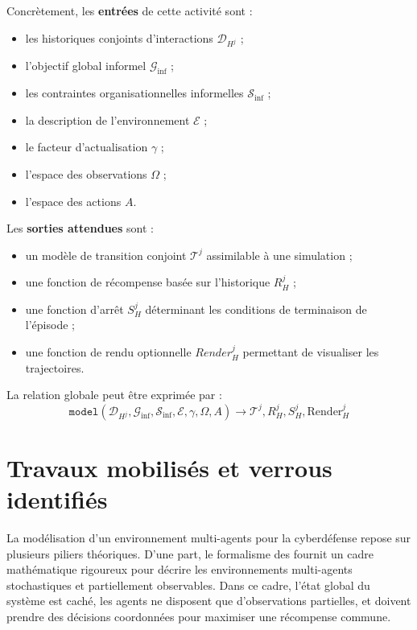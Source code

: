 Concrètement, les \textbf{entrées} de cette activité sont :
\begin{itemize}
    \item les historiques conjoints d’interactions $\mathcal{D}_{H^j}$ ;
    \item l’objectif global informel $\mathcal{G}_{\text{inf}}$ ;
    \item les contraintes organisationnelles informelles $\mathcal{S}_{\text{inf}}$ ;
    \item la description de l’environnement $\mathcal{E}$ ;
    \item le facteur d’actualisation $\gamma$ ;
    \item l’espace des observations $\Omega$ ;
    \item l’espace des actions $A$.
\end{itemize}

Les \textbf{sorties attendues} sont :
\begin{itemize}
    \item un modèle de transition conjoint $\mathcal{T}^j$ assimilable à une simulation ;
    \item une fonction de récompense basée sur l’historique $R^j_H$ ;
    \item une fonction d’arrêt $S^j_H$ déterminant les conditions de terminaison de l’épisode ;
    \item une fonction de rendu optionnelle $Render^j_H$ permettant de visualiser les trajectoires.
\end{itemize}

La relation globale peut être exprimée par :
\begin{displaymath}
    \texttt{model}(\mathcal{D}_{H^j}, \mathcal{G}_{\text{inf}}, \mathcal{S}_{\text{inf}}, \mathcal{E}, \gamma, \Omega, A) \rightarrow \mathcal{T}^j, R^j_H, S^j_H, \text{Render}^j_H
\end{displaymath}

\section*{Travaux mobilisés et verrous identifiés}

La modélisation d’un environnement multi-agents pour la cyberdéfense repose sur plusieurs piliers théoriques.
D’une part, le formalisme des \textbf{} fournit un cadre mathématique rigoureux pour décrire les environnements multi-agents stochastiques et partiellement observables.
Dans ce cadre, l’état global du système est caché, les agents ne disposent que d’observations partielles, et doivent prendre des décisions coordonnées pour maximiser une récompense commune.


